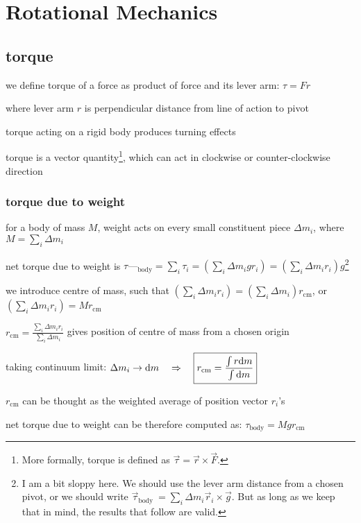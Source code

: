 \section{Rotational Mechanics}

\subsection{torque}


we define torque of a force as product of force and its lever arm: $\boxed{\tau = F r}$

where lever arm $r$ is perpendicular distance from line of action to pivot

torque acting on a rigid body produces turning effects

torque is a vector quantity\footnote{More formally, torque is defined as $\vec{\tau} = \vec{r} \times \vec{F}$.}, which can act in clockwise or counter-clockwise direction


\subsubsection*{torque due to weight}

for a body of mass $M$, weight acts on every small constituent piece $\Delta m_i$, where $M=\sum_i \Delta m_i$

net torque due to weight is $\tau—_\text{body} = \sum_i \tau_i = \left(\sum_i \Delta m_i g r_i\right) = \left(\sum_i \Delta m_i r_i\right) g$\footnote{I am a bit sloppy here. We should use the lever arm distance from a chosen pivot, or we should write $\vec{\tau}_\text{body}\ = \sum_i \Delta m_i \vec{r}_i \times \vec{g}$. But as long as we keep that in mind, the results that follow are valid.}

we introduce centre of mass, such that $\boxed{\left(\sum_i \Delta m_i r_i\right) = \left(\sum_i \Delta m_i\right) r_\text{cm}}$, or $\left(\sum_i \Delta m_i r_i\right) = M r_\text{cm}$

$r_\text{cm} = \frac{\sum_i \Delta m_i r_i}{\sum_i \Delta m_i}$ gives position of centre of mass from a chosen origin

taking continuum limit: $\Delta m_i \to \mathrm{d} m \quad \Rightarrow \quad \boxed{r_\text{cm} = \frac{\int r \mathrm{d} m}{\int \mathrm{d} m}}$

$r_\text{cm}$ can be thought as the weighted average of position vector $r_i$'s

net torque due to weight can be therefore computed as: $\boxed{\tau_\text{body} = Mgr_\text{cm}}$

